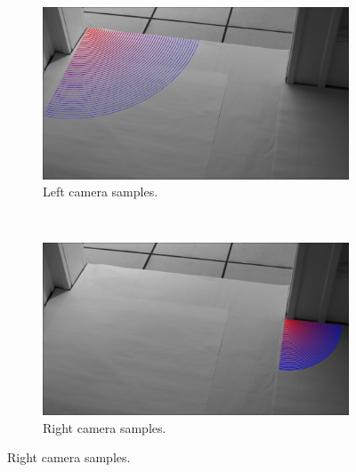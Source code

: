 \documentclass{article}
\begin{document}
\begin{figure}[htbp]
    \centering
    \begin{subfigure}[t]{0.45\textwidth}
        \includegraphics[width=\textwidth]{img/stereo_samples_1.png}
        \caption{Left camera samples.}
    \end{subfigure}
    ~
    \begin{subfigure}[t]{0.45\textwidth}
        \includegraphics[width=\textwidth]{img/stereo_samples_2.png}
        \caption{Right camera samples.}
    \end{subfigure}


\end{figure}
\end{document}
